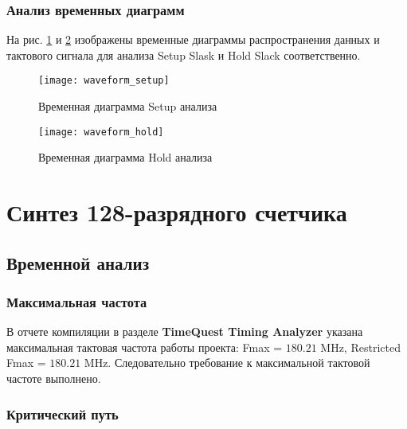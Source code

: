 \subsubsection{Анализ временных диаграмм}

На рис. \ref{fig:waveform_setup} и \ref{fig:waveform_hold} изображены временные диаграммы распространения данных и тактового сигнала для анализа Setup Slask и Hold Slack соответственно.

\begin{figure}[H]
\begin{center}
	\texttt{[image: waveform\_setup]}
	\caption{Временная диаграмма Setup анализа}
	\label{fig:waveform_setup}
\end{center}
\end{figure}
\vspace{-1.5cm}
\begin{figure}[H]
\begin{center}
	\texttt{[image: waveform\_hold]}
	\caption{Временная диаграмма Hold анализа}
	\label{fig:waveform_hold}
\end{center}
\end{figure}

\section{Синтез 128-разрядного счетчика}

\subsection{Временной анализ}

\subsubsection{Максимальная частота}

В отчете компиляции в разделе \textbf{TimeQuest Timing Analyzer} указана максимальная тактовая частота работы проекта: Fmax = $180.21$ MHz, Restricted Fmax = $180.21$ MHz. Следовательно требование к максимальной тактовой частоте выполнено.  

\subsubsection{Критический путь}

